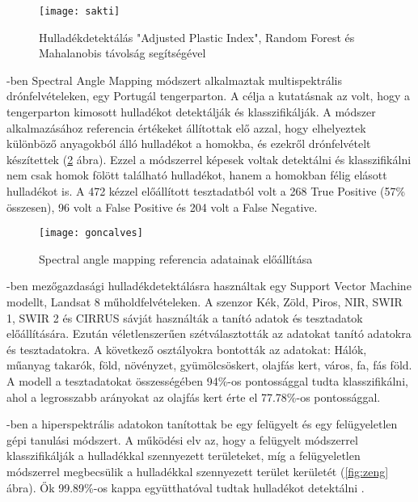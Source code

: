 \begin{figure}[H]
	\centering
	\texttt{[image: sakti]}
	\caption{Hulladékdetektálás "Adjusted Plastic Index", Random Forest és Mahalanobis távolság segítségével \cite{sakti2023}}
    \label{fig:sakti}
\end{figure}


\cite{goncalves2022}-ben Spectral Angle Mapping módszert alkalmaztak multispektrális drónfelvételeken, egy Portugál tengerparton. A célja a kutatásnak az volt, hogy a tengerparton kimosott hulladékot detektálják és klasszifikálják. A módszer alkalmazásához referencia értékeket állítottak elő azzal, hogy elhelyeztek különböző anyagokból álló hulladékot a homokba, és ezekről drónfelvételt készítettek (\ref{fig:goncalves} ábra). Ezzel a módszerrel képesek voltak detektálni és klasszifikálni nem csak homok fölött található hulladékot, hanem a homokban félig elásott hulladékot is. A 472 kézzel előállított tesztadatból volt a 268 True Positive (57\% összesen), 96 volt a False Positive és 204 volt a False Negative.

\begin{figure}[H]
	\centering
	\texttt{[image: goncalves]}
	\caption{Spectral angle mapping referencia adatainak előállítása \cite{goncalves2022}}
    \label{fig:goncalves}
\end{figure}

\cite{lanorte2017}-ben mezőgazdasági hulladékdetektálásra használtak egy Support Vector Machine modellt, Landsat 8 műholdfelvételeken. A szenzor Kék, Zöld, Piros, NIR, SWIR 1, SWIR 2 és CIRRUS sávját használták a tanító adatok és tesztadatok előállítására. Ezután véletlenszerűen szétválasztották az adatokat tanító adatokra és tesztadatokra. A következő osztályokra bontották az adatokat: Hálók, műanyag takarók, föld, növényzet, gyümölcsöskert, olajfás kert, város, fa, fás föld. A modell a tesztadatokat összességében 94\%-os pontossággal tudta klasszifikálni, ahol a legrosszabb arányokat az olajfás kert érte el 77.78\%-os pontossággal.

\cite{zeng2019}-ben a hiperspektrális adatokon tanítottak be egy felügyelt és egy felügyeletlen gépi tanulási módszert. A működési elv az, hogy a felügyelt módszerrel klasszifikálják a hulladékkal szennyezett területeket, míg a felügyeletlen módszerrel megbecsülik a hulladékkal szennyezett terület kerületét (\ref{fig:zeng} ábra). Ők 99.89\%-os kappa együtthatóval tudtak hulladékot detektálni .

